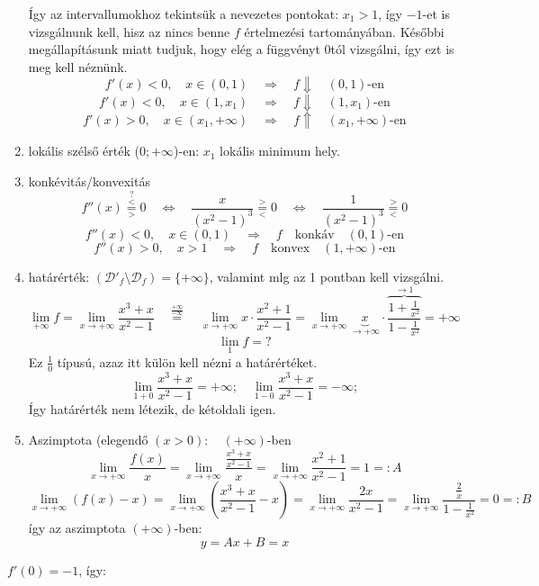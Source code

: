 \documentclass[a4paper,11.5pt]{article}
\begin{document}
\begin{task}
\begin{enumerate}
			Így az intervallumokhoz tekintsük a nevezetes pontokat: $x_1>1$, így $-1$-et is vizsgálnunk kell, hisz az nincs benne $f$ értelmezési tartományában. Későbbi megállapításunk miatt tudjuk, hogy elég a függvényt $0$tól vizsgálni, így ezt is meg kell néznünk.
			\[ f'(x)<0,\quad x\in(0,1)\quad \Rightarrow\quad f\Downarrow\quad (0,1)\text{-en} \]
			\[ f'(x)<0,\quad x\in(1,x_1)\quad \Rightarrow\quad f\Downarrow\quad (1,x_1)\text{-en} \]
			\[ f'(x)>0,\quad x\in(x_1,+\infty)\quad \Rightarrow\quad f\Uparrow\quad (x_1,+\infty)\text{-en} \]
			\item lokális szélső érték ($0;+\infty$)-en: $x_1$ lokális minimum hely.
			\item konkévitás/konvexitás
			\[ f''(x)\overset{?}{\overset{<}{\underset{>}{=}}}0\quad \Leftrightarrow\quad \frac{x}{(x^2-1)^3}\overset{>}{\underset{<}{=}}0\quad \Leftrightarrow\quad \frac{1}{(x^2-1)^3}\overset{>}{\underset{<}{=}}0 \]
			\[ f''(x)<0,\quad x\in(0,1)\quad \Rightarrow\quad f\quad \text{konkáv}\quad (0,1)\text{-en} \]
			\[ f''(x)>0,\quad x>1\quad \Rightarrow\quad f\quad \text{konvex}\quad (1,+\infty)\text{-en} \]
			\item határérték: $(\mathcal{D'}_f\setminus\mathcal{D}_f)=\{+\infty\}$, valamint mlg az 1 pontban kell vizsgálni.
			\[ \lim_{+\infty}f=\lim_{x\to+\infty}\frac{x^3+x}{x^2-1}\quad \overset{\frac{+\infty}{-\infty}}{=}\quad \lim_{x\to+\infty}x\cdot\frac{x^2+1}{x^2-1}=\lim_{x\to+\infty}\underbrace{x}_{\to+\infty}\cdot\frac{\overbrace{1+\frac{1}{x^2}}^{\to 1}} {\displaystyle 1-\frac{1}{x^2}} =+\infty \]
			\[ \lim_1f=? \]
			Ez $\frac{1}{0}$ típusú, azaz itt külön kell nézni a határértéket.
			\[ \lim_{1+0}\frac{{x^3+x} }{x^2-1}=+\infty;\quad \lim_{1-0}\frac{{x^3+x} }{x^2-1}=-\infty;  \]
			Így határérték nem létezik, de kétoldali igen.
			\item Aszimptota (elegendő $(x>0):\quad (+\infty)$-ben
			\[ \lim_{x\to+\infty}\frac{f(x)}{x}=\lim_{x\to+\infty}\frac{\frac{x^3+x}{x^2-1}}{x}=\lim_{x\to+\infty}\frac{x^2+1}{x^2-1}=1=:A \]
			\[ \lim_{x\to+\infty}(f(x)-x)=\lim_{x\to+\infty}\left(\frac{x^3+x}{x^2-1}-x\right)=\lim_{x\to+\infty}\frac{2x}{x^2-1}=\lim_{x\to+\infty}\frac{\frac{2}{x}}{1-\frac{1}{x^2}}=0=:B \]
			így az aszimptota $(+\infty)$-ben:
			\[ y=Ax+B=x \]
		\end{enumerate}
		$f'(0)=-1$, így:
	\end{task}
\end{document}
